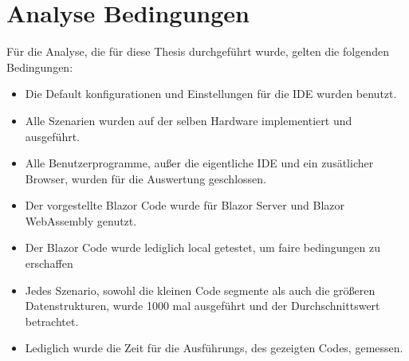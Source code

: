 \section{Analyse Bedingungen}
\label{sec:bedingungen}
Für die Analyse, die für diese Thesis durchgeführt wurde, gelten die folgenden Bedingungen:

\begin{itemize}
    \item Die Default konfigurationen und Einstellungen für die IDE wurden benutzt.
    \item Alle Szenarien wurden auf der selben Hardware implementiert und ausgeführt.
    \item Alle Benutzerprogramme, außer die eigentliche IDE und ein zusätlicher Browser, wurden
    für die Auswertung geschlossen.
    \item Der vorgestellte Blazor Code wurde für Blazor Server und Blazor WebAssembly genutzt.
    \item Der Blazor Code wurde lediglich local getestet, um faire bedingungen zu erschaffen
    \item Jedes Szenario, sowohl die kleinen Code segmente als auch die größeren Datenstrukturen,
    wurde 1000 mal ausgeführt und der Durchschnittswert betrachtet.
    \item Lediglich wurde die Zeit für die Ausführungs, des gezeigten Codes, gemessen.
\end{itemize}